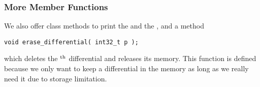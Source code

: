 \subsubsection{More Member Functions}
\label{chapter_program:kappa:css:more_methods}

We also offer class methods to print the  and the , and a method
\begin{lstlisting}
void erase_differential( int32_t p );
\end{lstlisting}
which deletes the ${}^{\text{th}}$ differential and releases its memory. 
This function is defined because we only want to keep a differential in the memory
as long as we really need it due to storage limitation.
